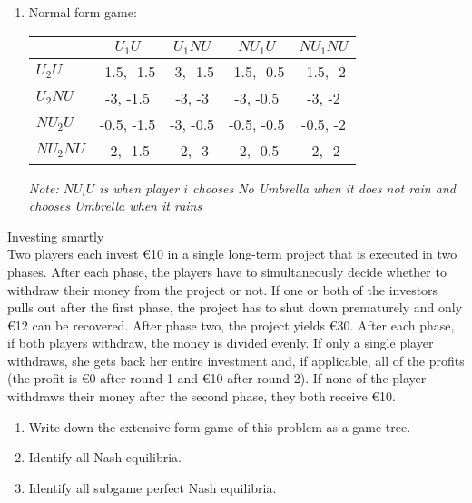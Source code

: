 \documentclass[../main.tex]{subfiles}
\begin{document}
\begin{solution}
\begin{enumerate}
\begin{center}
\end{center}

\item Normal form game:
\begin{center}
	    \begin{tabular}{|l|c|c|c|c|}
	    \hline
	    			      & $U_1 U$ 		& $U_1 NU$ 		& $NU_1 U$ 		& $NU_1 NU$ 	\\
	    \hline
	    $U_2 U$ 	  & -1.5, -1.5 	& -3, -1.5	  & -1.5, -0.5 	& -1.5, -2		\\
	    \hline
	    $U_2 NU$  	& -3, -1.5 		& -3, -3 		  & -3, -0.5 		& -3, -2			\\
	    \hline
	    $NU_2 U$  	& -0.5, -1.5 	& -3, -0.5 	  & -0.5, -0.5 	& -0.5, -2    \\
	    \hline
	    $NU_2 NU$  	& -2, -1.5	 	& -2, -3 		 & -2, -0.5 		& -2, -2		  \\
	    \hline
	    \end{tabular}
    \end{center}
    \emph{Note: $NU_i U $ is when player $i$ chooses No Umbrella when it does not rain and chooses Umbrella when it rains}

\end{enumerate}
\end{solution}

\begin{question}
Investing smartly\\
Two players each invest \euro10 in a single long-term project that is executed in two phases. After each phase, the players have to simultaneously decide whether to withdraw their money from the project or not. If one or both of the investors pulls out after the first phase, the project has to shut down prematurely and only \euro12 can be recovered. After phase two, the project yields \euro30. After each phase, if both players withdraw, the money is divided evenly. If only a single player withdraws, she gets back her entire investment and, if applicable, all of the profits (the profit is \euro0 after round 1 and \euro10 after round 2). If none of the player withdraws their money after the second phase, they both receive \euro10.
\begin{enumerate}
\item Write down the extensive form game of this problem as a game tree.
\item Identify all Nash equilibria.
\item Identify all subgame perfect Nash equilibria.
\end{enumerate}
\end{question}
\end{document}
